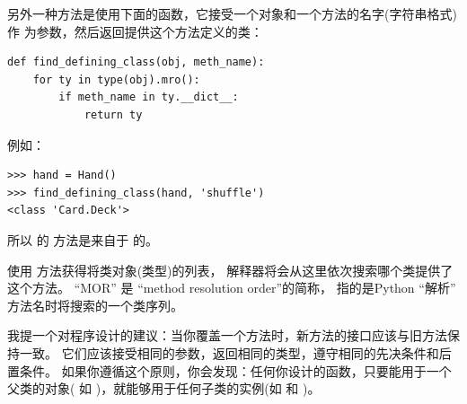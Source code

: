 

另外一种方法是使用下面的函数，它接受一个对象和一个方法的名字(字符串格式)作
为参数，然后返回提供这个方法定义的类：

\begin{lstlisting}
def find_defining_class(obj, meth_name):
    for ty in type(obj).mro():
        if meth_name in ty.__dict__:
            return ty
\end{lstlisting}

例如：

\begin{lstlisting}
>>> hand = Hand()
>>> find_defining_class(hand, 'shuffle')
<class 'Card.Deck'>
\end{lstlisting}


所以  的  方法是来自于  的。



 使用  方法获得将类对象(类型)的列表，
解释器将会从这里依次搜索哪个类提供了这个方法。
``MOR'' 是 ``method resolution order''的简称， 指的是Python ``解析'' 方法名时将搜索的一个类序列。



我提一个对程序设计的建议：当你覆盖一个方法时，新方法的接口应该与旧方法保持一致。
它们应该接受相同的参数，返回相同的类型，遵守相同的先决条件和后置条件。
如果你遵循这个原则，你会发现：任何你设计的函数，只要能用于一个父类的对象(
如  )，就能够用于任何子类的实例(如  和  )。

